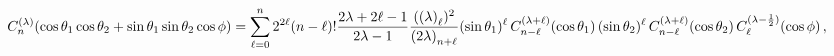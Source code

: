 \[\mathop{C^{(\lambda)}_{n}\/}\nolimits\!\left(\mathop{\cos\/}\nolimits\theta_{1%
}\mathop{\cos\/}\nolimits\theta_{2}+\mathop{\sin\/}\nolimits\theta_{1}\mathop{%
\sin\/}\nolimits\theta_{2}\mathop{\cos\/}\nolimits\phi\right)=\sum_{\ell=0}^{n%
}2^{2\ell}(n-\ell)!\frac{2\lambda+2\ell-1}{2\lambda-1}\frac{(\left(\lambda%
\right)_{\ell})^{2}}{\left(2\lambda\right)_{n+\ell}}(\mathop{\sin\/}\nolimits%
\theta_{1})^{\ell}\mathop{C^{(\lambda+\ell)}_{n-\ell}\/}\nolimits\!\left(%
\mathop{\cos\/}\nolimits\theta_{1}\right)(\mathop{\sin\/}\nolimits\theta_{2})^%
{\ell}\mathop{C^{(\lambda+\ell)}_{n-\ell}\/}\nolimits\!\left(\mathop{\cos\/}%
\nolimits\theta_{2}\right)\mathop{C^{(\lambda-\frac{1}{2})}_{\ell}\/}\nolimits%
\!\left(\mathop{\cos\/}\nolimits\phi\right),\]